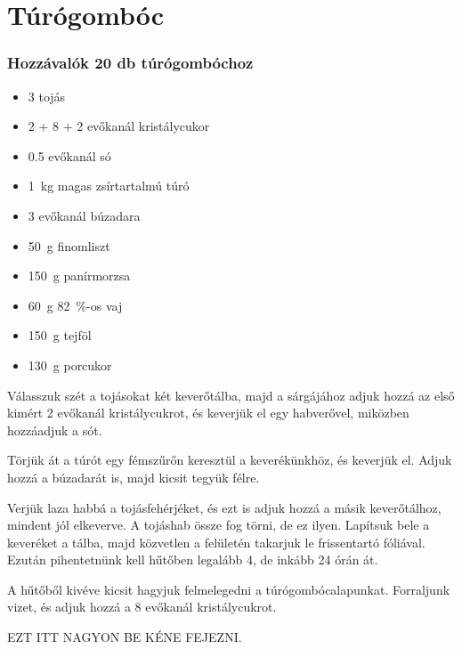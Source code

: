 \newpage
\section{Túrógombóc} \label{sec:turogomboc}

\subsubsection*{Hozzávalók 20 db túrógombóchoz}
\begin{itemize}
    \item \num{3} tojás
    \item \num{2} + \num{8} + \num{2} evőkanál kristálycukor
    \item \num{0.5} evőkanál só
    \item \qty{1}{\kg} magas zsírtartalmú túró
    \item \num{3} evőkanál búzadara
    \item \qty{50}{\g} finomliszt
    \item \qty{150}{\g} panírmorzsa
    \item \qty{60}{\g} \qty{82}{\percent}-os vaj
    \item \qty{150}{\g} tejföl
    \item \qty{130}{\g} porcukor
\end{itemize}

Válasszuk szét a tojásokat két keverőtálba, majd a sárgájához adjuk hozzá az első kimért \num{2} evőkanál kristálycukrot, és keverjük el egy habverővel, miközben hozzáadjuk a sót.

Törjük át a túrót egy fémszűrőn keresztül a keverékünkhöz, és keverjük el. Adjuk hozzá a búzadarát is, majd kicsit tegyük félre.

Verjük laza habbá a tojásfehérjéket, és ezt is adjuk hozzá a másik keverőtálhoz, mindent jól elkeverve. A tojáshab össze fog törni, de ez ilyen. Lapítsuk bele a keveréket a tálba, majd közvetlen a felületén takarjuk le frissentartó fóliával. Ezután pihentetnünk kell hűtőben legalább \num{4}, de inkább \num{24} órán át.

A hűtőből kivéve kicsit hagyjuk felmelegedni a túrógombócalapunkat. Forraljunk vizet, és adjuk hozzá a \num{8} evőkanál kristálycukrot.

EZT ITT NAGYON BE KÉNE FEJEZNI.
